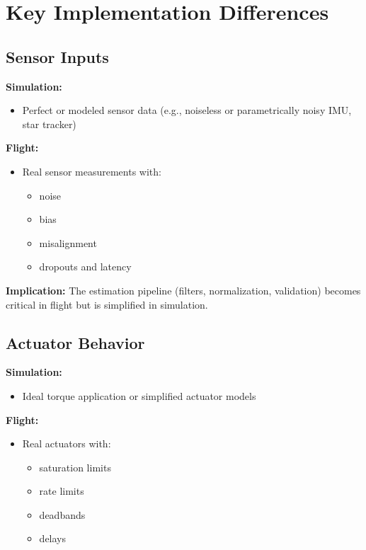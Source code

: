 \section{Key Implementation Differences}

\subsection{Sensor Inputs}

\textbf{Simulation:}
\begin{itemize}
	\item Perfect or modeled sensor data (e.g., noiseless or parametrically noisy IMU, star tracker)
\end{itemize}

\textbf{Flight:}
\begin{itemize}
	\item Real sensor measurements with:
	\begin{itemize}
		\item noise
		\item bias
		\item misalignment
		\item dropouts and latency
	\end{itemize}
\end{itemize}

\textbf{Implication:}  
The estimation pipeline (filters, normalization, validation) becomes critical in flight but is simplified in simulation.

\subsection{Actuator Behavior}

\textbf{Simulation:}
\begin{itemize}
	\item Ideal torque application or simplified actuator models
\end{itemize}

\textbf{Flight:}
\begin{itemize}
	\item Real actuators with:
	\begin{itemize}
		\item saturation limits
		\item rate limits
		\item deadbands
		\item delays
	\end{itemize}
\end{itemize}

